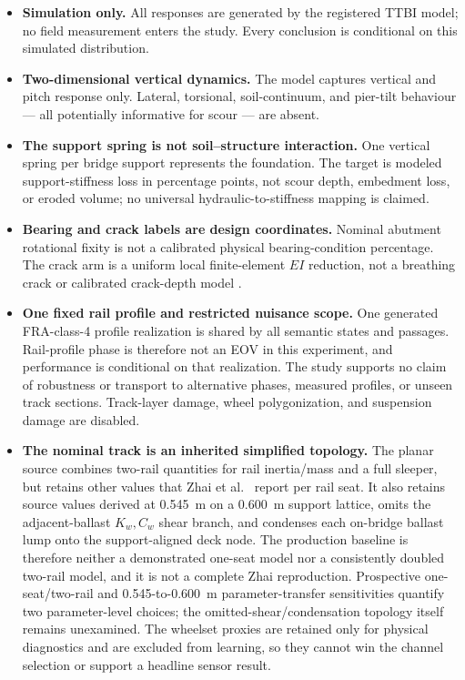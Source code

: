 \begin{itemize}
  \item \textbf{Simulation only.} All responses are generated by the registered
  TTBI model; no field measurement enters the study. Every conclusion is
  conditional on this simulated distribution.

  \item \textbf{Two-dimensional vertical dynamics.} The model captures
  vertical and pitch response only. Lateral, torsional, soil-continuum, and
  pier-tilt behaviour --- all potentially informative for scour --- are absent.

  \item \textbf{The support spring is not soil--structure interaction.} One
  vertical spring per bridge support represents the foundation. The target is
  modeled support-stiffness loss in percentage points, not scour depth,
  embedment loss, or eroded volume; no universal hydraulic-to-stiffness mapping
  is claimed.

  \item \textbf{Bearing and crack labels are design coordinates.} Nominal
  abutment rotational fixity is not a calibrated physical bearing-condition
  percentage. The crack arm is a uniform local finite-element $EI$ reduction,
  not a breathing crack or calibrated crack-depth model
  \cite{sinha2002simplified}.

  \item \textbf{One fixed rail profile and restricted nuisance scope.}
  One generated FRA-class-4 profile realization is shared by all semantic
  states and passages. Rail-profile phase is therefore not an EOV in this
  experiment, and performance is conditional on that realization. The study
  supports no claim of robustness or transport to alternative phases, measured
  profiles, or unseen track sections. Track-layer damage, wheel
  polygonization, and suspension damage are disabled.

  \item \textbf{The nominal track is an inherited simplified topology.} The
  planar source combines two-rail quantities for rail inertia/mass and a full
  sleeper, but retains other values that Zhai et al.~\cite{zhai2004track}
  report per rail seat. It also retains source values derived at 0.545~m on a
  0.600~m support lattice, omits the adjacent-ballast $K_w,C_w$ shear branch,
  and condenses each on-bridge ballast lump onto the support-aligned deck node.
  The production baseline is therefore neither a demonstrated one-seat model
  nor a consistently doubled two-rail model, and it is not a complete Zhai
  reproduction. Prospective one-seat/two-rail and 0.545-to-0.600~m
  parameter-transfer sensitivities quantify two parameter-level choices; the
  omitted-shear/condensation topology itself remains unexamined. The wheelset
  proxies are retained only for physical diagnostics and are excluded from
  learning, so they cannot win the channel selection or support a headline
  sensor result.


\end{itemize}
